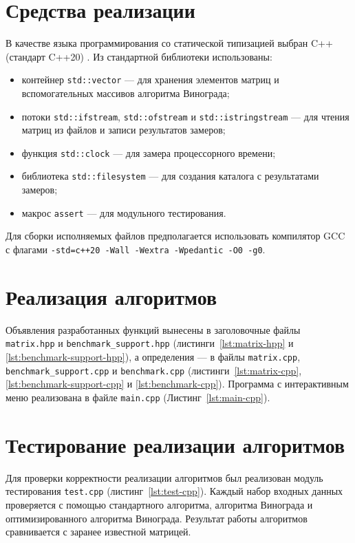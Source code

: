 \documentclass{bmstu}
\begin{document}
\section{Средства реализации}
В качестве языка программирования со статической типизацией выбран C++
(стандарт C++20) \cite{cpp20}. Из стандартной библиотеки использованы:
\begin{itemize}
	\item контейнер \texttt{std::vector} --- для хранения элементов матриц и
	      вспомогательных массивов алгоритма Винограда;
	\item потоки \texttt{std::ifstream}, \texttt{std::ofstream} и
	      \texttt{std::istringstream} --- для чтения матриц из файлов и
	      записи результатов замеров;
	\item функция \texttt{std::clock} --- для замера процессорного времени;
	\item библиотека \texttt{std::filesystem} --- для создания каталога
	      с результатами замеров;
	\item макрос \texttt{assert} --- для модульного тестирования.
\end{itemize}

Для сборки исполняемых файлов предполагается использовать компилятор GCC
с флагами \texttt{-std=c++20 -Wall -Wextra -Wpedantic -O0 -g0}.

\section{Реализация алгоритмов}
Объявления разработанных функций вынесены в заголовочные файлы
\texttt{matrix.hpp} и \texttt{benchmark\_support.hpp} (листинги~\ref{lst:matrix-hpp}
и \ref{lst:benchmark-support-hpp}), а определения --- в файлы \texttt{matrix.cpp},
\texttt{benchmark\_support.cpp} и \texttt{benchmark.cpp} (листинги~\ref{lst:matrix-cpp},
\ref{lst:benchmark-support-cpp} и \ref{lst:benchmark-cpp}). Программа
с интерактивным меню реализована в файле \texttt{main.cpp} (Листинг~\ref{lst:main-cpp}).

\section{Тестирование реализации алгоритмов}
Для проверки корректности реализации алгоритмов был реализован модуль
тестирования \texttt{test.cpp} (листинг~\ref{lst:test-cpp}). Каждый набор входных данных проверяется
с помощью стандартного алгоритма, алгоритма Винограда и оптимизированного
алгоритма Винограда. Результат работы алгоритмов сравнивается с заранее
известной матрицей.
\end{document}
